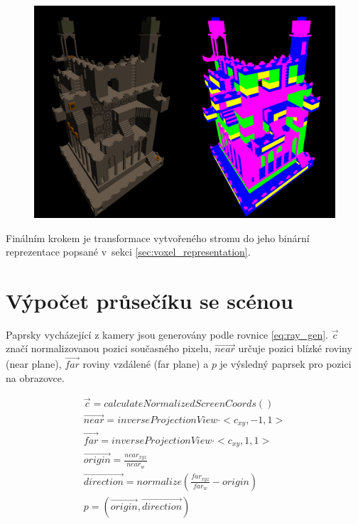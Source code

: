 \begin{figure}[H]
	\centering
	\includegraphics[scale=0.7]{obrazky-figures/levels_render.png}
	\captionsetup{justification=centering}
	\label{fig:imgui_classes}
\end{figure}



Finálním krokem je transformace vytvořeného stromu do jeho binární reprezentace popsané v~sekci \ref{sec:voxel_representation}.


\section{Výpočet průsečíku se scénou} \label{sec:bvh_traversal_impl}
Paprsky vycházející z kamery jsou generovány podle rovnice \ref{eq:ray_gen}. $\vec{c}$ značí normalizovanou pozici současného pixelu, $\vec{near}$ určuje pozici blízké roviny (near plane), $\vec{far}$ roviny vzdálené (far plane) a $p$ je výsledný paprsek pro pozici na obrazovce.


\begin{equation} \label{eq:ray_gen}
	\begin{gathered}
	    \vec{c} = calculateNormalizedScreenCoords()\\
	    \vec{near} = inverseProjectionView \cdot <c_{xy}, -1, 1>\\
	    \vec{far} = inverseProjectionView \cdot <c_{xy}, 1, 1>\\
	    \vec{origin} = \frac{near_{xyz}}{near_w}\\
	    \vec{direction} = normalize(\frac{far_{xyz}}{far_w} - origin)\\
	    p = (\vec{origin}, \vec{direction})
	\end{gathered}
\end{equation}

